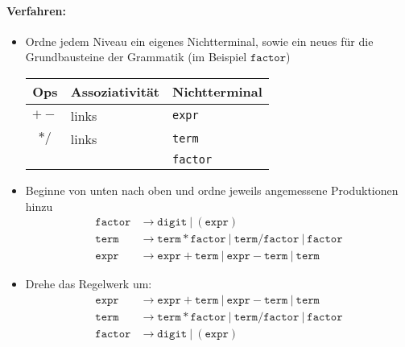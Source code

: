 \paragraph{Verfahren:}
\begin{itemize}
 \item Ordne jedem Niveau ein eigenes Nichtterminal, sowie ein neues für die Grundbausteine der Grammatik (im Beispiel $\mathtt{factor}$)
	\begin{center}
	\begin{tabular}{c|l|l}
	\textbf{Ops} & \textbf{Assoziativität} & Nichtterminal \\
	\hline\hline
	$+-$ & links & \texttt{expr} \\
	$*/$ & links & \texttt{term} \\
	\hline
	&&\texttt{factor}
	\end{tabular}
	\end{center}
 \item Beginne von unten nach oben und ordne jeweils angemessene Produktionen hinzu
	\begin{align*}
		\mathtt{factor} &\to \mathtt{digit}\ |\ (\mathtt{expr}) \\
		\mathtt{term} &\to \mathtt{term} * \mathtt{factor}\ |\ \mathtt{term} / \mathtt{factor}\ |\ \mathtt{factor} \\
		\mathtt{expr} &\to \mathtt{expr} + \mathtt{term}\  |\  \mathtt{expr} - \mathtt{term}\ |\ \mathtt{term}
	\end{align*}
 \item Drehe das Regelwerk um:
	\begin{align*}
		\mathtt{expr} &\to \mathtt{expr} + \mathtt{term}\  |\  \mathtt{expr} - \mathtt{term}\ |\ \mathtt{term} \\
		\mathtt{term} &\to \mathtt{term} * \mathtt{factor}\ |\ \mathtt{term} / \mathtt{factor}\ |\ \mathtt{factor} \\
		\mathtt{factor} &\to \mathtt{digit}\ |\ (\mathtt{expr}) \\
	\end{align*}
\end{itemize}






